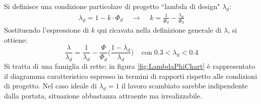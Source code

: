 Si definisce una condizione particolare di progetto ``lambda di design" $\lambda_d$:
\begin{align*}
\lambda_d = 1 - k \cdot \Phi_d \;\;\;\; \rightarrow \;\;\;\; k = \frac{1}{\Phi_d}-\frac{\lambda_d}{\Phi_d}
\end{align*}
Sostituendo l'espressione di $k$ qui ricavata nella definizione generale di $\lambda$, si ottiene:
\begin{equation} \label{eq:lambdad}
\frac{\lambda}{\lambda_d} = \frac{1}{\lambda_d} - \frac{\Phi}{\Phi_d} \Bigg( \frac{1-\lambda_d}{\lambda_d} \Bigg) \;\;\;\; \text{con}\; 0.3 < \lambda_d < 0.4
\end{equation}
Si tratta di una famiglia di rette; in figura \ref{fig:LambdaPhiChart} è rappresentato il diagramma caratteristico espresso in termini di rapporti rispetto alle condizioni di progetto. Nel caso ideale di $\lambda_d = 1$ il lavoro scambiato sarebbe indipendente dalla portata, situazione abbastanza attraente ma irrealizzabile. 

